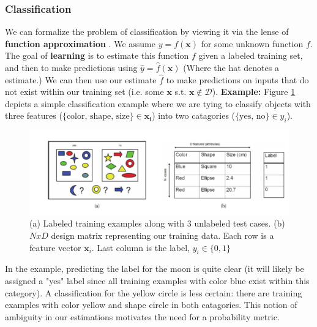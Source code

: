 \documentclass[12pt]{article}
\begin{document}
\subsubsection{Classification}
We can formalize the problem of classification by viewing it via the lense of \textbf{function approximation} \cite{murphy}. We assume \(y = f(\mathbf{x})\) for some unknown function \(f\). The goal of \textbf{learning} is to estimate this function \(f\) given a labeled training set, and then to make predictions using \(\hat{y} = \hat{f}(\mathbf{x})\) (Where the hat denotes a estimate.) We can then use our estimate \(\hat{f}\) to make predictions on inputs that do not exist within our training set (i.e. some \(\mathbf{x}\) s.t. \(\mathbf{x} \notin \mathcal{D}\)).
\newline
\textbf{Example:}
\newline
Figure \ref{fig:classificationex1} depicts a simple classification example where we are tying to classify objects with three features (\( \lbrace \text{color, shape, size} \rbrace \in \mathbf{x_i} \)) into two catagories (\(\lbrace \text{yes, no} \rbrace \in y_i\)).
\begin{figure}[h]
\includegraphics[width=\textwidth]{murphy-fig-1-1.png}
\caption{(a) Labeled training examples along with 3 unlabeled test cases. (b) \(N x D\) design matrix representing our training data. Each row is a feature vector \(\mathbf{x}_i\). Last column is the label, \(y_i \in \lbrace 0, 1 \rbrace \) \cite{murphy}}
\label{fig:classificationex1}
\end{figure}

In the example, predicting the label for the moon is quite clear (it will likely be assigned a "yes" label since all training examples with color blue exist within this category). A classification for the yellow circle is less certain: there are training examples with color yellow and shape circle in both catagories. This notion of ambiguity in our estimations motivates the need for a probability metric. 
\end{document}
